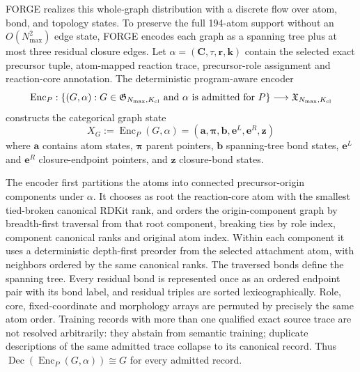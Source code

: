 \documentclass{article}
\begin{document}
FORGE realizes this whole-graph distribution with a discrete flow over atom, bond, and topology
states.
To preserve the full 194-atom support without an $O(N_{\max}^2)$ edge state, FORGE encodes each
graph as a spanning tree plus at most three residual closure edges.
Let $\alpha=(\mathbf C,\tau,\mathbf r,\mathbf k)$ contain the selected exact precursor tuple,
atom-mapped reaction trace, precursor-role assignment and reaction-core annotation. The deterministic
program-aware encoder
\begin{equation}
    \operatorname{Enc}_P:
    \{(G,\alpha):G\in\mathfrak G_{N_{\max},K_{\rm cl}}
      \text{ and }\alpha\text{ is admitted for }P\}
    \longrightarrow \mathfrak X_{N_{\max},K_{\rm cl}}
\end{equation}
constructs the categorical graph state
\begin{equation}
    X_G:=\operatorname{Enc}_P(G,\alpha)=
    \left(
        \mathbf{a},
        \boldsymbol{\pi},
        \mathbf{b},
        \mathbf{e}^{L},
        \mathbf{e}^{R},
        \mathbf{z}
    \right)
\end{equation}
where $\mathbf{a}$ contains atom states, $\boldsymbol{\pi}$
parent pointers, $\mathbf{b}$ spanning-tree bond states, $\mathbf{e}^{L}$ and $\mathbf{e}^{R}$
closure-endpoint pointers, and $\mathbf{z}$ closure-bond states.

The encoder first partitions the atoms into connected precursor-origin components under $\alpha$.
It chooses as root the reaction-core atom with the smallest tied-broken canonical RDKit rank, and
orders the origin-component graph by breadth-first traversal from that root component, breaking
ties by role index, component canonical ranks and original atom index. Within each component it uses
a deterministic depth-first preorder from the selected attachment atom, with neighbors ordered by
the same canonical ranks. The traversed bonds define the spanning tree. Every residual bond is
represented once as an ordered endpoint pair with its bond label, and residual triples are sorted
lexicographically. Role, core, fixed-coordinate and morphology arrays are permuted by precisely the
same atom order. Training records with more than one qualified exact source trace are not resolved
arbitrarily: they abstain from semantic training; duplicate descriptions of the same admitted trace
collapse to its canonical record. Thus
$\operatorname{Dec}(\operatorname{Enc}_P(G,\alpha))\cong G$ for every admitted record.
\end{document}
